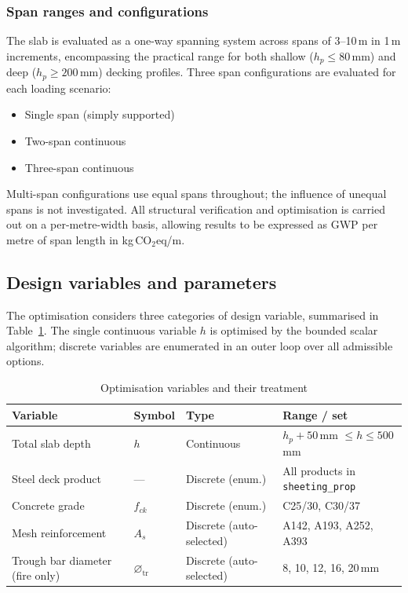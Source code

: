 \subsubsection*{Span ranges and configurations}
The slab is evaluated as a one-way spanning system across spans of 3--10\,m in 1\,m increments, encompassing the practical range for both shallow ($h_p \le 80$\,mm) and deep ($h_p \ge 200$\,mm) decking profiles. Three span configurations are evaluated for each loading scenario:
\begin{itemize}
    \item Single span (simply supported)
    \item Two-span continuous
    \item Three-span continuous
\end{itemize}
Multi-span configurations use equal spans throughout; the influence of unequal spans is not investigated. All structural verification and optimisation is carried out on a per-metre-width basis, allowing results to be expressed as GWP per metre of span length in kg\,CO$_2$eq/m.

\subsection{Design variables and parameters}
\label{sec:design_vars}
The optimisation considers three categories of design variable, summarised in Table~\ref{tab:opt_variables}. The single continuous variable $h$ is optimised by the bounded scalar algorithm; discrete variables are enumerated in an outer loop over all admissible options.

\begin{table}[h!]
\small
\centering
\caption{Optimisation variables and their treatment}
\label{tab:opt_variables}
\begin{tabular}{p{5cm} p{2.5cm} p{2cm} p{4cm}}
\toprule
\textbf{Variable} & \textbf{Symbol} & \textbf{Type} & \textbf{Range / set} \\
\midrule
Total slab depth                  & $h$            & Continuous & $h_p + 50$\,mm $\le h \le 500$\,mm \\
Steel deck product                & ---            & Discrete (enum.) & All products in \texttt{sheeting\_prop} \\
Concrete grade                    & $f_{ck}$       & Discrete (enum.) & C25/30, C30/37 \\
Mesh reinforcement                & $A_s$          & Discrete (auto-selected) & A142, A193, A252, A393 \\
Trough bar diameter (fire only)   & $\varnothing_\mathrm{tr}$ & Discrete (auto-selected) & 8, 10, 12, 16, 20\,mm \\
\bottomrule
\end{tabular}
\end{table}

